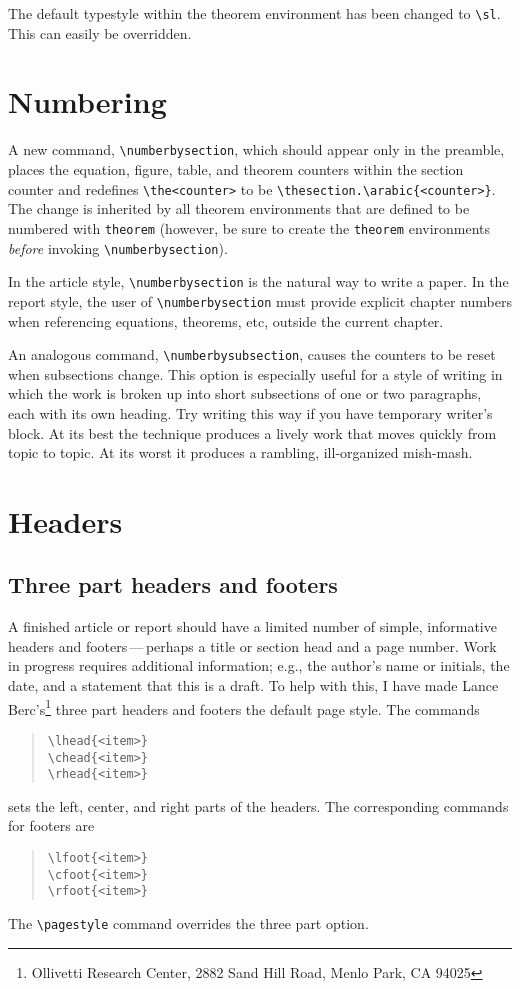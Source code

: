 The default typestyle within the theorem environment has been
changed to \verb|\sl|.  This can easily be overridden.

\section{Numbering}

A new command, \verb|\numberbysection|, which should appear only in
the preamble, places the equation, figure, table, and theorem counters
within the section counter and redefines \verb|\the<counter>| to be
\verb|\thesection.\arabic{<counter>}|.  The change is inherited by all
theorem environments that are defined to be numbered with
\verb|theorem| (however, be sure to create the \verb|theorem|
environments {\it before} invoking \verb|\numberbysection|).

In the article style, \verb|\numberbysection| is the natural way to
write a paper.  In the report style, the user of
\verb|\numberbysection| must provide explicit chapter numbers
when referencing equations, theorems, etc, outside the
current chapter.

An analogous command, \verb|\numberbysubsection|, causes the
counters to be reset when subsections change.  This option is
especially useful for a style of writing in which the work is
broken up into short subsections of one or two paragraphs, each
with its own heading.  Try writing this way if you have
temporary writer's block.  At its best the technique produces a
lively work that moves quickly from topic to topic.  At its
worst it produces a rambling, ill-organized mish-mash.

\section{Headers}

\subsection{Three part headers and footers}

A finished article or report should have a limited number of simple,
informative headers and footers\,---\,perhaps a title or section head
and a page number.  Work in progress requires additional information;
e.g., the author's name or initials, the date, and a statement that
this is a draft.  To help with this, I have made Lance
Berc's\footnote{Ollivetti Research Center, 2882 Sand Hill Road,
Menlo Park, CA 94025} three part headers and footers the default page
style.  The commands
\begin{quote}
\begin{verbatim}
\lhead{<item>}
\chead{<item>}
\rhead{<item>}
\end{verbatim}
\end{quote}
sets the left, center, and right parts of the headers.  The
corresponding commands for footers are
\begin{quote}
\begin{verbatim}
\lfoot{<item>}
\cfoot{<item>}
\rfoot{<item>}
\end{verbatim}
\end{quote}
The \verb|\pagestyle| command
overrides the three part option.

